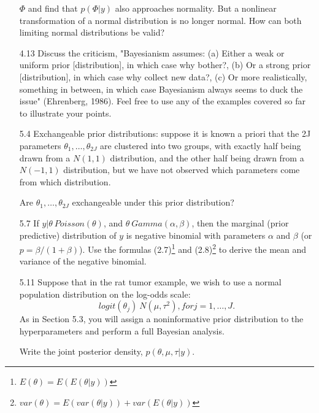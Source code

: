 \documentclass[12pt,a4paper,twoside]{article}
\begin{document}
\begin{enumerate}
    $\Phi$ and find that $p(\Phi|y)$ also approaches normality. But a nonlinear transformation of a normal distribution is no longer normal. How
    can both limiting normal distributions be valid\cite{Chapter4Exercises}?
    \item[4.13] Discuss the criticism, "Bayesianism assumes: (a) Either a weak or uniform prior [distribution], in which case why bother?, (b) Or a
    strong prior [distribution], in which case why collect new data?, (c) Or more realistically, something in between, in which case Bayesianism
    always seems to duck the issue" (Ehrenberg, 1986). Feel free to use any of the examples covered so far to illustrate your points.
    \item[5.4] Exchangeable prior distributions: suppose it is known a priori that the 2J parameters $\theta_1,\dots, \theta_{2J}$ are clustered
    into two groups, with exactly half being drawn from a $N(1, 1)$ distribution, and the other half being drawn from a $N(-1, 1)$ distribution,
    but we have not observed which parameters come from which distribution.
    
    Are $\theta_1,\dots, \theta_{2J}$ exchangeable under this prior distribution?
    \item[5.7] If $y|\theta ~ Poisson(\theta)$, and $\theta ~ Gamma(\alpha, \beta)$, then the marginal (prior predictive) distribution of $y$ is
    negative binomial with parameters $\alpha$ and $\beta$ (or $p = \beta/(1 + \beta)$). Use the formulas (2.7)\footnote{$E(\theta) = E(E(\theta|y))$}
    and (2.8)\footnote{$var(\theta) = E(var(\theta|y)) + var(E(\theta|y))$} to derive the mean and variance of the negative binomial.
    \item[5.11] Suppose that in the rat tumor example, we wish to use a normal population distribution on the log-odds scale:
    \[
    logit(\theta_j ) ~ N(\mu, \tau^2),for j = 1,\dots, J.
    \]
    As in Section 5.3, you will assign a noninformative prior distribution to the hyperparameters and perform a full Bayesian analysis.
    
    Write the joint posterior density, $p(\theta, \mu, \tau|y)$. 
\end{enumerate}

\newpage



\end{document}
